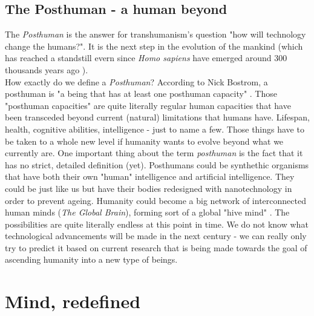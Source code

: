 \documentclass[12pt]{article}
\begin{document}
\subsection{The Posthuman - a human beyond}
	The \emph{Posthuman} is the answer for transhumanism's question "how will technology change the humans?". It is the next step in the evolution of the mankind (which has reached a standstill evern since \emph{Homo sapiens} have emerged around 300 thousands years ago \cite{wikipediaHumans}). 
	\\How exactly do we define a \emph{Posthuman}? According to Nick Bostrom, a posthuman is "a being that has at least one posthuman capacity" \cite{posthuman:1}. Those "posthuman capacities" are quite literally regular human capacities that have been transceded beyond current (natural) limitations that humans have. Lifespan, health, cognitive abilities, intelligence - just to name a few. Those things have to be taken to a whole new level if humanity wants to evolve beyond what we currently are. One important thing about the term \emph{posthuman} is the fact that it has no strict, detailed definition (yet). Posthumans could be synthethic organisms that have both their own "human" intelligence and artificial intelligence. They could be just like us but have their bodies redesigned with nanotechnology in order to prevent ageing. Humanity could become a big network of interconnected human minds (\emph{The Global Brain}), forming sort of a global "hive mind" \cite{transhumanistFAQ:2}. The possibilities are quite literally endless at this point in time. We do not know what technological advancements will be made in the next century - we can really only try to predict it based on current research that is being made towards the goal of ascending humanity into a new type of beings.
\section{Mind, redefined}
\end{document}
